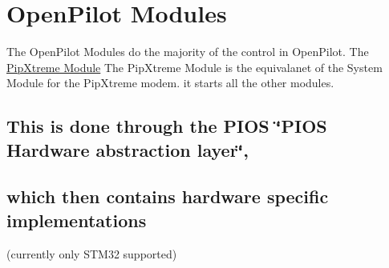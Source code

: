 \hypertarget{group___open_pilot_modules}{\section{Open\-Pilot Modules}
\label{group___open_pilot_modules}
}


The Open\-Pilot Modules do the majority of the control in Open\-Pilot. The \hyperlink{group___pip_xtreme_module}{Pip\-Xtreme Module} The Pip\-Xtreme Module is the equivalanet of the System Module for the Pip\-Xtreme modem. it starts all the other modules. \subsection*{This is done through the  P\-I\-O\-S \char`\"{}\-P\-I\-O\-S Hardware abstraction layer\char`\"{},}

\subsection*{which then contains hardware specific implementations}

(currently only S\-T\-M32 supported)  


